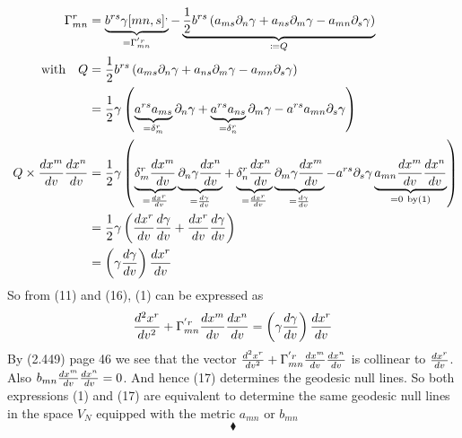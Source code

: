 \begin{align}
\Gamma^r_{mn} & =\underbrace{b^{rs}\gamma[mn,s]^,}_{=\Gamma^{'r}_{mn}}  - \underbrace{\frac{1}{2} b^{rs}\left( a_{ms}\partial_n \gamma+a_{ns}\partial_m \gamma-a_{mn}\partial_s \gamma \right)}_{\coloneqq Q}\\
\text{with}\quad Q &= \frac{1}{2} b^{rs}\left( a_{ms}\partial_n \gamma+a_{ns}\partial_m \gamma-a_{mn}\partial_s \gamma \right)\\
&= \frac{1}{2} \gamma \left( \underbrace{a^{rs}a_{ms}}_{ = \delta^r_m}\partial_n \gamma+\underbrace{a^{rs}a_{ns}}_{ = \delta^r_n}\partial_m \gamma-a^{rs}a_{mn}\partial_s \gamma \right)\\
\ Q \times \dv{x^m}{v}\dv{x^n}{v} &= \frac{1}{2} \gamma \left( \underbrace{\delta^r_m\dv{x^m}{v}}_{=\dv{x^r}{v}} \underbrace{\partial_n \gamma \dv{x^n}{v}}_{= \dv{\gamma}{v}}+\underbrace{\delta^r_n\dv{x^n}{v}}_{=\dv{x^r}{v}}\underbrace{\partial_m \gamma\dv{x^m}{v}}_{= \dv{\gamma}{v}}-a^{rs}\partial_s \gamma \underbrace{a_{mn}\dv{x^m}{v}\dv{x^n}{v}}_{ = 0 \ \text{by(1)}} \right)\\
&= \frac{1}{2} \gamma \left( \dv{x^r}{v}\dv{\gamma}{v} +\dv{x^r}{v}\dv{\gamma}{v} \right)\\
&= \left(\gamma\dv{\gamma}{v} \right)  \dv{x^r}{v}
\end{align}
So from (11) and (16), (1) can be expressed as 
\begin{align}
\dv[2]{x^r}{v} + \Gamma^{'r}_{mn}\dv{x^m}{v}\dv{x^n}{v} = \left(\gamma\dv{\gamma}{v} \right)  \dv{x^r}{v}
\end{align}
By (2.449) page 46 we see that the vector 
$\dv[2]{x^r}{v} + \Gamma^{'r}_{mn}\dv{x^m}{v}\dv{x^n}{v}$ is collinear to $\dv{x^r}{v}$. Also $b_{mn}\dv{x^m}{v}\dv{x^n}{v} = 0$. And hence (17) determines the geodesic null lines. So both expressions (1) and (17) are equivalent to determine the same geodesic null lines in the space $V_N$ equipped with the metric $a_{mn}$ or  $b_{mn}$
$$\blacklozenge$$
\newpage


